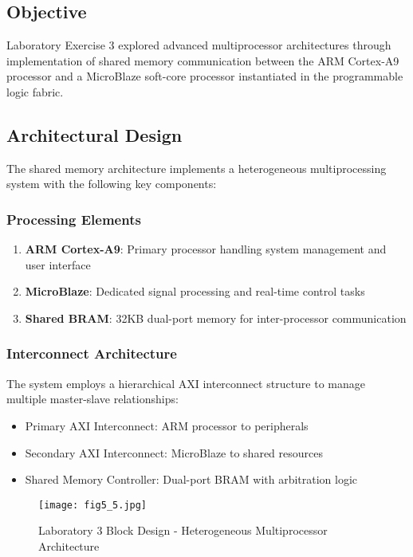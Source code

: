 \documentclass[11pt,a4paper]{article}
\begin{document}
\subsection{Objective}
Laboratory Exercise 3 explored advanced multiprocessor architectures through implementation of shared memory communication between the ARM Cortex-A9 processor and a MicroBlaze soft-core processor instantiated in the programmable logic fabric.

\subsection{Architectural Design}

The shared memory architecture implements a heterogeneous multiprocessing system with the following key components:

\subsubsection{Processing Elements}
\begin{enumerate}[leftmargin=*]
    \item \textbf{ARM Cortex-A9}: Primary processor handling system management and user interface
    \item \textbf{MicroBlaze}: Dedicated signal processing and real-time control tasks
    \item \textbf{Shared BRAM}: 32KB dual-port memory for inter-processor communication
\end{enumerate}

\subsubsection{Interconnect Architecture}
The system employs a hierarchical AXI interconnect structure to manage multiple master-slave relationships:

\begin{itemize}[leftmargin=*]
    \item Primary AXI Interconnect: ARM processor to peripherals
    \item Secondary AXI Interconnect: MicroBlaze to shared resources  
    \item Shared Memory Controller: Dual-port BRAM with arbitration logic
\end{itemize}

\begin{figure}[H]
    \centering
    \texttt{[image: fig5\_5.jpg]}
    \caption{Laboratory 3 Block Design - Heterogeneous Multiprocessor Architecture}
    \label{fig:lab3_block}
\end{figure}
\end{document}
